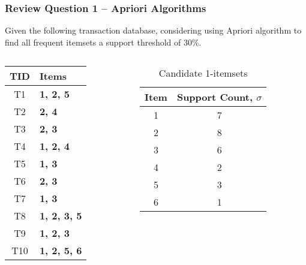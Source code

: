\documentclass[aspectratio=169, 10pt]{beamer}
\begin{document}
\begin{frame}[t]
\frametitle{Review Question 1 -- Apriori Algorithms}
\small

Given the following transaction database, considering using Apriori algorithm to find all frequent itemsets a support threshold of 30\%.

\begin{columns}
    \begin{column}{0.5\textwidth} 
        \begin{table}[]
            \begin{tabular}{c|l}
            TID & \textbf{Items}      \\ \hline
            T1   & \textbf{1, 2, 5}    \\
            T2   & \textbf{2, 4}       \\
            T3   & \textbf{2, 3}       \\
            T4   & \textbf{1, 2, 4}    \\
            T5   & \textbf{1, 3}       \\
            T6   & \textbf{2, 3}       \\
            T7   & \textbf{1, 3}       \\
            T8   & \textbf{1, 2, 3, 5} \\
            T9   & \textbf{1, 2, 3}    \\
            T10  & \textbf{1, 2, 5, 6}
            \end{tabular}
        \end{table}
    \end{column}
    \begin{column}{0.5\textwidth} %

        \begin{table}[]
            \begin{tabular}{c|c}
                Item                     & Support Count, $\sigma$           \\ \hline
                1                        & 7                        \\
                2                        & 8                        \\
                3                        & 6                        \\
                {\color[HTML]{FE0000} 4} & {\color[HTML]{FE0000} 2} \\
                5                        & 3                        \\
                {\color[HTML]{FE0000} 6} & {\color[HTML]{FE0000} 1}
            \end{tabular}
            \caption{Candidate 1-itemsets}
        \end{table}
        

\end{column}
\end{columns}
\end{frame}
\end{document}
